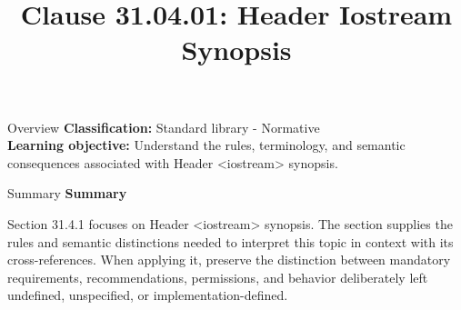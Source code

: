 \documentclass[10pt,letterpaper]{article}
\title{Clause 31.04.01: Header Iostream Synopsis}
\author{}
\date{}
\begin{document}
\maketitle
\begin{CornellOverviewBox}{Overview}
\textbf{Classification:} Standard library - Normative\\[2pt]
\textbf{Learning objective:} Understand the rules, terminology, and semantic consequences associated with Header <iostream> synopsis.
\end{CornellOverviewBox}\begin{CornellSummaryBox}{Summary}
{\sffamily\bfseries\color{Accent} Summary}\par\vspace{3pt}Section 31.4.1 focuses on Header <iostream> synopsis. The section supplies the rules and semantic distinctions needed to interpret this topic in context with its cross-references. When applying it, preserve the distinction between mandatory requirements, recommendations, permissions, and behavior deliberately left undefined, unspecified, or implementation-defined.
\end{CornellSummaryBox}
\end{document}
